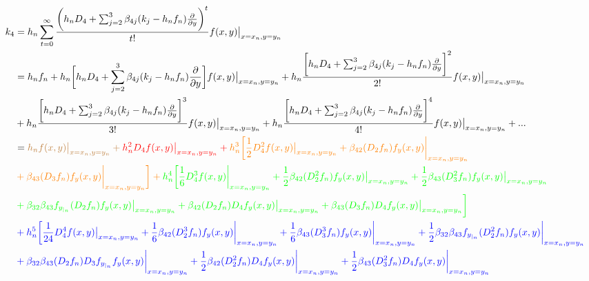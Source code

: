 \documentclass[12 pt]{article}
\begin{document}
	\normalsize
	\begin{equation}
		\begin{split}
			k_{4} &= h_{n}\sum_{t=0}^{\infty}\frac{\bigg(h_{n}D_{4}+\sum_{j=2}^{3}\beta_{4j}(k_{j}-h_{n}f_{n})\frac{\partial}{\partial y}\bigg)^{t}}{t!}f(x,y)\big\vert_{x = x_{n}, y= y_{n}}\\
			&= h_{n}f_{n} + h_{n}\bigg[h_{n}D_{4} + \sum_{j=2}^{3}\beta_{4j}(k_{j} - h_{n}f_{n})\frac{\partial}{\partial y}\bigg]f(x,y)\big\vert_{x = x_{n}, y= y_{n}} + h_{n}\frac{\bigg[h_{n}D_{4} + \sum_{j=2}^{3}\beta_{4j}(k_{j} - h_{n}f_{n})\frac{\partial}{\partial y}\bigg]^{2}}{2!}f(x,y)\big\vert_{x = x_{n}, y= y_{n}}\\
			&+  h_{n}\frac{\bigg[h_{n}D_{4} + \sum_{j=2}^{3}\beta_{4j}(k_{j} - h_{n}f_{n})\frac{\partial}{\partial y}\bigg]^{3}}{3!}f(x,y)\big\vert_{x = x_{n}, y= y_{n}} +  h_{n}\frac{\bigg[h_{n}D_{4} + \sum_{j=2}^{3}\beta_{4j}(k_{j} - h_{n}f_{n})\frac{\partial}{\partial y}\bigg]^{4}}{4!}f(x,y)\big\vert_{x = x_{n}, y= y_{n}} + ...\\
			&= \color{brown}h_{n}f(x,y)\big\vert_{x = x_{n}, y= y_{n}} + \color{red}h_{n}^{2}D_{4}f(x,y)\big\vert_{x = x_{n}, y= y_{n}} + \color{orange}h_{n}^{3}\bigg[\frac{1}{2}D_{4}^{2}f(x,y)\big\vert_{x = x_{n}, y= y_{n}} + \beta_{42}(D_{2}f_{n})f_{y}(x,y)\bigg\vert_{x=x_{n}, y= y_{n}} \\
			&\color{orange}+ \beta_{43}(D_{3}f_{n})f_{y}(x,y)\bigg\vert_{x=x_{n}, y= y_{n}}\bigg] + \color{green}h_{n}^{4}\bigg[\frac{1}{6}D_{4}^{3}f(x,y)\bigg\vert_{x=x_{n}, y= y_{n}} + \frac{1}{2}\beta_{42}(D_{2}^{2}f_{n})f_{y}(x,y)\big\vert_{x = x_{n}, y= y_{n}} + \frac{1}{2}\beta_{43}(D_{3}^{2}f_{n})f_{y}(x,y)\big\vert_{x = x_{n}, y= y_{n}}\\
			&\color{green}+ \beta_{32}\beta_{43}f_{y_{|_{n}}}(D_{2}f_{n})f_{y}(x,y)\big\vert_{x = x_{n}, y= y_{n}} + \beta_{42}(D_{2}f_{n})D_{4}f_{y}(x,y)\big\vert_{x = x_{n}, y= y_{n}} + \beta_{43}(D_{3}f_{n})D_{4}f_{y}(x,y)\big\vert_{x = x_{n}, y= y_{n}}\bigg]\\
			&\color{blue}+h_{n}^{5}\bigg[\frac{1}{24}D_{4}^{4}f(x,y)\big\vert_{x = x_{n}, y= y_{n}} + \frac{1}{6}\beta_{42}(D_{2}^{3}f_{n})f_{y}(x,y)\bigg\vert_{x=x_{n}, y= y_{n}} +\frac{1}{6}\beta_{43}(D_{3}^{3}f_{n})f_{y}(x,y)\bigg\vert_{x=x_{n}, y= y_{n}} + \frac{1}{2}\beta_{32}\beta_{43}f_{y_{|_{n}}}(D_{2}^{2}f_{n})f_{y}(x,y)\bigg\vert_{x=x_{n}, y= y_{n}}\\
			&\color{blue}+ \beta_{32}\beta_{43}(D_{2}f_{n})D_{3}f_{y_{|_{n}}}f_{y}(x,y)\bigg\vert_{x=x_{n}, y= y_{n}} + \frac{1}{2}\beta_{42}(D_{2}^{2}f_{n})D_{4}f_{y}(x,y)\bigg\vert_{x=x_{n}, y= y_{n}} + \frac{1}{2}\beta_{43}(D_{3}^{2}f_{n})D_{4}f_{y}(x,y)\bigg\vert_{x=x_{n}, y= y_{n}} \\

\end{split}
\end{equation}
\end{document}

